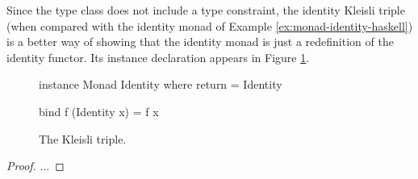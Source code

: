 \begin{example}
  \label{ex:triple-identity-haskell}

  Since the  type class does not include a
   type constraint, the identity Kleisli triple
  (when compared with the identity monad of Example
  \ref{ex:monad-identity-haskell}) is a better way of showing that the
  identity monad is just a redefinition of the identity functor. Its
  instance declaration appears in Figure
  \ref{fig:triple-identity-haskell}.

  \begin{figure}[htbp]
    \begin{codehaskell}
instance Monad Identity where
  return = Identity

  bind f (Identity x) = f x
    \end{codehaskell}
    \caption{The  Kleisli triple.}
    \label{fig:triple-identity-haskell}
  \end{figure}

  \begin{proof}

    ...

  \end{proof}

\end{example}

